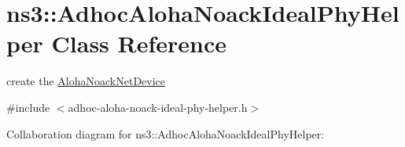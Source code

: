 \hypertarget{classns3_1_1AdhocAlohaNoackIdealPhyHelper}{}\section{ns3\+:\+:Adhoc\+Aloha\+Noack\+Ideal\+Phy\+Helper Class Reference}
\label{classns3_1_1AdhocAlohaNoackIdealPhyHelper}


create the \hyperlink{classns3_1_1AlohaNoackNetDevice}{Aloha\+Noack\+Net\+Device}  




{\ttfamily \#include $<$adhoc-\/aloha-\/noack-\/ideal-\/phy-\/helper.\+h$>$}



Collaboration diagram for ns3\+:\+:Adhoc\+Aloha\+Noack\+Ideal\+Phy\+Helper\+:
